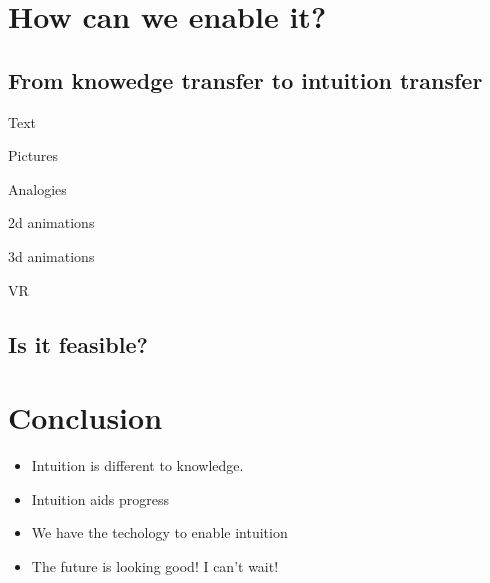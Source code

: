 \documentclass{beamer}
\begin{document}
\section{How can we enable it?}
\subsection{From knowedge transfer to intuition transfer}
\begin{frame}{Text}
\end{frame}
\begin{frame}{Pictures}
\end{frame}
\begin{frame}{Analogies}
\end{frame}
\begin{frame}{2d animations}
\end{frame}
\begin{frame}{3d animations}
\end{frame}
\begin{frame}{VR}
\end{frame}
\subsection{Is it feasible?}
\section{Conclusion}
\begin{frame}
\begin{itemize}
	\item {Intuition is different to knowledge.}
	\item{Intuition aids progress}
	\item{We have the techology to enable intuition}
	\item{The future is looking good! I can't wait!}
\end{itemize}
\end{frame}
\end{document}
